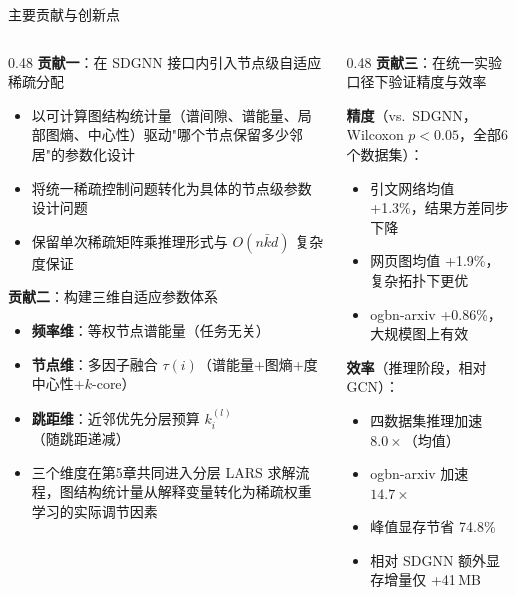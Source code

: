 \documentclass[aspectratio=169,9pt,xcolor=dvipsnames]{beamer}
\newcommand{\blue}[1]{\textcolor{mynavy}{#1}}
\newcommand{\green}[1]{\textcolor{mygreen}{#1}}
\newcommand{\kbar}{\ensuremath{\bar{k}}}
\begin{document}
\begin{frame}{主要贡献与创新点}
  \begin{columns}[T]
    \begin{column}{0.48\textwidth}
      \textbf{\blue{贡献一}}：在 SDGNN 接口内引入节点级自适应稀疏分配
      \begin{itemize}
        \item 以可计算图结构统计量（谱间隙、谱能量、局部图熵、中心性）驱动"哪个节点保留多少邻居"的参数化设计
        \item 将统一稀疏控制问题转化为具体的节点级参数设计问题
        \item 保留单次稀疏矩阵乘推理形式与 $O(n\kbar d)$ 复杂度保证
      \end{itemize}

      \vspace{0.2cm}
      \textbf{\blue{贡献二}}：构建三维自适应参数体系
      \begin{itemize}
        \item \textbf{频率维}：等权节点谱能量（任务无关）
        \item \textbf{节点维}：多因子融合 $\tau(i)$（谱能量+图熵+度中心性+$k$-core）
        \item \textbf{跳距维}：近邻优先分层预算 $k_i^{(l)}$（随跳距递减）
        \item 三个维度在第5章共同进入分层 LARS 求解流程，图结构统计量从解释变量转化为稀疏权重学习的实际调节因素
      \end{itemize}
    \end{column}

    \begin{column}{0.48\textwidth}
      \textbf{\blue{贡献三}}：在统一实验口径下验证精度与效率

      \textbf{精度}（vs.\ SDGNN，Wilcoxon $p<0.05$，全部6个数据集）：
      \begin{itemize}
        \item 引文网络均值 \green{+1.3\%}，结果方差同步下降
        \item 网页图均值 \green{+1.9\%}，复杂拓扑下更优
        \item ogbn-arxiv \green{+0.86\%}，大规模图上有效
      \end{itemize}

      \vspace{0.15cm}
      \textbf{效率}（推理阶段，相对 GCN）：
      \begin{itemize}
        \item 四数据集推理加速 \blue{$8.0\times$}（均值）
        \item ogbn-arxiv 加速 \blue{$14.7\times$}
        \item 峰值显存节省 \blue{74.8\%}
        \item 相对 SDGNN 额外显存增量仅 +41\,MB
      \end{itemize}


\end{column}
\end{columns}
\end{frame}
\end{document}
